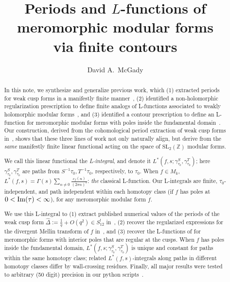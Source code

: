 \documentclass[11pt]{article}
\title{Periods and $L$-functions of meromorphic modular forms\\
via finite contours}
\author{David A.\ McGady}
\date{}
\numberwithin{equation}{section}  %
\newcommand{\ZZ}{\mathbb{Z}}
\newcommand{\SLZ}{\mathrm{SL}_2(\ZZ)}
\newcommand{\Dhat}{\widehat{\Delta}}
\begin{document}
\maketitle

\begin{abstract}
In this note, we synthesize and generalize previous work, which 
(1) extracted periods for weak cusp forms in a manifestly finite 
manner~\cite{Brown2017}, (2) identified a non-holomorphic regularization 
prescription to define finite analogs of L-functions associated to weakly 
holomorphic modular forms~\cite{BFK2011}, and (3) identified a contour 
prescription to define an L-function for meromorphic modular forms with poles inside 
the fundamental domain~\cite{1806}. Our construction, derived from the 
cohomological period extraction of weak cusp forms in~\cite{Brown2017}, 
shows that these three lines of work not only naturally align, but derive from 
the \emph{same} manifestly finite linear functional acting on the space of $\SLZ$ 
modular forms. 

We call this linear functional the \emph{L-integral}, and denote it 
$L^*(f, s; \gamma^S_{\tau_0}, \gamma^T_{\tau_0})$; here 
$\gamma^S_{\tau_0}, \gamma^T_{\tau_0}$ are paths from 
$S^{-1}\tau_0, T^{-1}\tau_0$, respectively, to $\tau_0$. When $f \in M_k$, 
$L^*(f,s) = \Gamma(s) \sum_{n\neq0} \tfrac{c_f(n)}{(2\pi n)^s}$: \emph{the} 
classical L-function. Our L-integrals are finite, $\tau_0$-independent, and path 
independent within each homotopy class (if $f$ has poles at $0 < {\rm Im}(\tau) 
< \infty$), for any meromorphic modular form $f$.

We use this L-integral to (1) extract published numerical values of the 
periods of the weak cusp form $\Dhat := \tfrac{1}{q} + O(q^2) \in S_{12}^!$ 
in~\cite{Brown2017}, (2) recover the regularized expressions for the 
divergent Mellin transform of $f$ in~\cite{BFK2011}, and (3) recover the 
L-functions of \cite{1806} for meromorphic forms with interior poles that are 
regular at the cusps. When $f$ has poles inside the fundamental domain, 
$L^*(f, s; \gamma^S_{\tau_0}, \gamma^T_{\tau_0})$ is unique and constant for 
paths within the same homotopy class; related $L^*(f,s)$-integrals along paths 
in different homotopy classes differ by wall-crossing residues. Finally, all major 
results were tested to arbitrary (50 digit) precision in our python scripts~\cite{VerifyScripts}.
\end{abstract}
\end{document}
